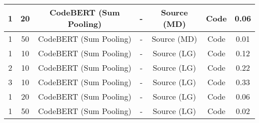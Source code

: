 \begin{longtable}{|c|c|c|c|c|c|c|}
\hline
1 & 20 & CodeBERT (Sum Pooling) & - & Source (MD) & Code & 0.06 \\
\hline
1 & 50 & CodeBERT (Sum Pooling) & - & Source (MD) & Code & 0.01 \\
\hline
1 & 10 & CodeBERT (Sum Pooling) & - & Source (LG) & Code & 0.12 \\
\hline
2 & 10 & CodeBERT (Sum Pooling) & - & Source (LG) & Code & 0.22 \\
\hline
3 & 10 & CodeBERT (Sum Pooling) & - & Source (LG) & Code & 0.33 \\
\hline
1 & 20 & CodeBERT (Sum Pooling) & - & Source (LG) & Code & 0.06 \\
\hline
1 & 50 & CodeBERT (Sum Pooling) & - & Source (LG) & Code & 0.02 \\
\hline
\end{longtable}
